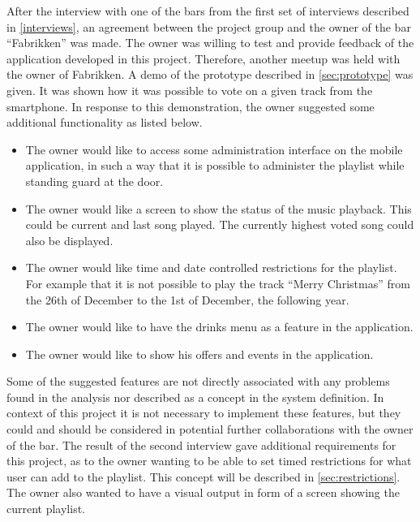 \label{sec:fabrikken}
After the interview with one of the bars from the first set of interviews described in \cref{interviews}, an agreement between the project group and the owner of the bar \enquote{Fabrikken} was made. The owner was willing to test and provide feedback of the application developed in this project. Therefore, another meetup was held with the owner of Fabrikken. A demo of the prototype described in \cref{sec:prototype} was given. It was shown how it was possible to vote on a given track from the smartphone. In response to this demonstration, the owner suggested some additional functionality as listed below.

\begin{itemize}
    \item{The owner would like to access some administration interface on the mobile application, in such a way that it is possible to administer the playlist while standing guard at the door.}
    \item{The owner would like a screen to show the status of the music playback. This could be current and last song played. The currently highest voted song could also be displayed.}
    \item{The owner would like time and date controlled restrictions for the playlist. For example that it is not possible to play the track \enquote{Merry Christmas} from the 26th of December to the 1st of December, the following year.}
    \item{The owner would like to have the drinks menu as a feature in the application.}
    \item{The owner would like to show his offers and events in the application.}
\end{itemize}

Some of the suggested features are not directly associated with any
problems found in the analysis nor described as a concept in the
system definition. In context of this project it is not
necessary to implement these features, but they could and should be
considered in potential further collaborations with the owner of the
bar. The result of the second interview gave additional requirements
for this project, as to the owner wanting to be able to set timed
restrictions for what user can add to the playlist. This concept will
be described in \cref{sec:restrictions}. The owner also wanted to have
a visual output in form of a screen showing the current playlist.
